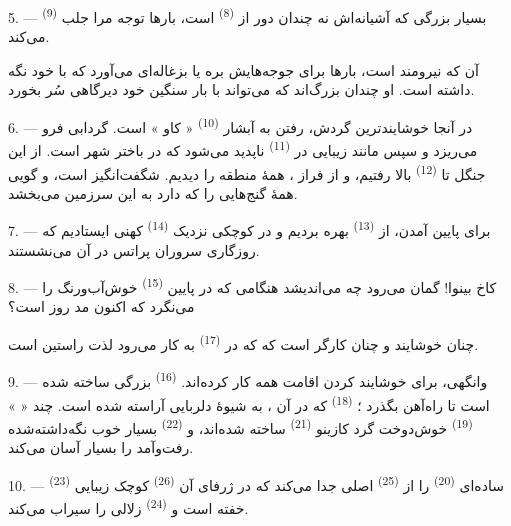 5. ---  \textsuperscript{(9)} بسیار بزرگی که آشیانه‌اش نه
چندان دور از  \textsuperscript{(8)} است، بارها توجه مرا
جلب می‌کند.

آن  که  نیرومند است، بارها برای
جوجه‌هایش بره یا بزغاله‌ای می‌آورد که با  خود نگه
داشته است.  او چندان بزرگ‌اند که می‌تواند با بار
سنگین خود دیرگاهی سُر بخورد.

\VUsaut{3.0mm}
\VUsaut{3.0mm}

6. --- در آنجا خوشایندترین گردش، رفتن به آبشار \textsuperscript{(10)}
« کاو » است.  گردابی فرو می‌ریزد و سپس مانند
 زیبایی در  \textsuperscript{(11)}
ناپدید می‌شود که در باختر شهر است. از این جنگل تا  \textsuperscript{(12)} بالا رفتیم، و از فراز
، همهٔ  منطقه را دیدیم.
 شگفت‌انگیز است، و  گویی همهٔ گنج‌هایی را
که دارد به این سرزمین می‌بخشد.

7. --- برای پایین آمدن، از  \textsuperscript{(13)}
بهره بردیم و در  کوچکی نزدیک 
\textsuperscript{(14)}  کهنی ایستادیم که روزگاری
سروران پراتس در آن می‌نشستند.

8. --- کاخ بینوا! گمان می‌رود چه می‌اندیشد هنگامی که در پایین
 \textsuperscript{(15)} خوش‌آب‌ورنگ را می‌نگرد که
اکنون  مد روز است؟

 چنان خوشایند و  چنان کارگر است که
 که در  \textsuperscript{(17)}
به کار می‌رود لذت راستین است.

\VUsaut{3.0mm}
\VUsaut{3.0mm}

9. --- وانگهی، برای خوشایند کردن اقامت همه کار کرده‌اند.
 \textsuperscript{(16)} بزرگی ساخته شده است تا راه‌آهن
بگذرد ؛  \textsuperscript{(18)} 
که در آن ، به شیوهٔ دلربایی آراسته شده است. چند
«  » \textsuperscript{(19)} خوش‌دوخت گرد کازینو
\textsuperscript{(21)} ساخته شده‌اند، و 
\textsuperscript{(22)} بسیار خوب نگه‌داشته‌شده رفت‌وآمد را بسیار آسان
می‌کند.

10. ---  \textsuperscript{(23)} ساده‌ای 
\textsuperscript{(20)} را از  \textsuperscript{(25)}
اصلی جدا می‌کند که در ژرفای آن  \textsuperscript{(26)}
کوچک زیبایی خفته است و  \textsuperscript{(24)} زلالی را
سیراب می‌کند.

